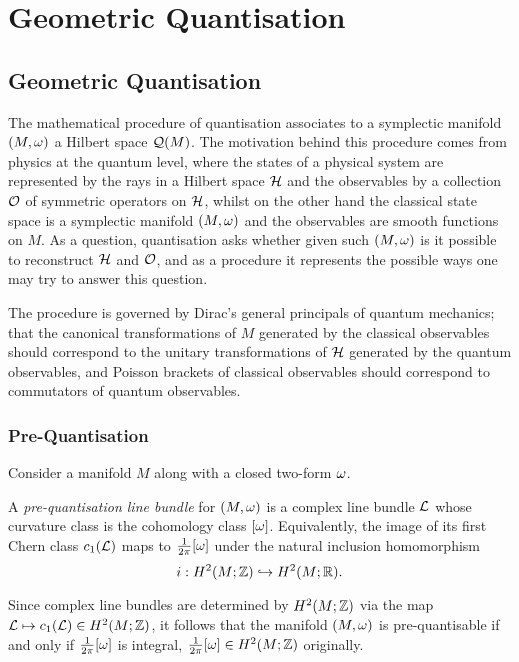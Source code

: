 \chapter{Geometric Quantisation}

\section{Geometric Quantisation}

The mathematical procedure of quantisation associates to a symplectic manifold $(M,\omega)$ a Hilbert space $\mathcal{Q}(M)$. The motivation behind this procedure comes from physics at the quantum level, where the states of a physical system are represented by the rays in a Hilbert space $\mathcal{H}$ and the observables by a collection $\mathcal{O}$ of symmetric operators on $\mathcal{H}$, whilst on the other hand the classical state space is a symplectic manifold $(M,\omega)$ and the observables are smooth functions on $M$. As a question, quantisation asks whether given such $(M,\omega)$ is it possible to reconstruct $\mathcal{H}$ and $\mathcal{O}$, and as a procedure it represents the possible ways one may try to answer this question.

The procedure is governed by Dirac's general principals of quantum mechanics; that the canonical transformations of $M$ generated by the classical observables should correspond to the unitary transformations of $\mathcal{H}$ generated by the quantum observables, and Poisson brackets of classical observables should correspond to commutators of quantum observables.

\subsection{Pre-Quantisation}

Consider a manifold $M$ along with a closed two-form $\omega$.

\begin{defn}
	A \emph{pre-quantisation line bundle} for $(M,\omega)$ is a complex line bundle $\mathcal{L}$ whose curvature class is the cohomology class $[\omega]$. Equivalently, the image of its first Chern class $c_{1}(\mathcal{L})$ maps to $\tfrac{1}{2\pi}[\omega]$ under the natural inclusion homomorphism
	\begin{equation*}
		i: H^{2}(M;\mathbb{Z}) \hookrightarrow H^{2}(M;\mathbb{R}).
	\end{equation*}
\end{defn}

Since complex line bundles are determined by $H^{2}(M;\mathbb{Z})$ via the map $\mathcal{L} \mapsto c_{1}(\mathcal{L}) \in H^{2}(M;\mathbb{Z})$, it follows that the manifold $(M,\omega)$ is pre-quantisable if and only if $\tfrac{1}{2\pi}[\omega]$ is integral, \ie $\tfrac{1}{2\pi}[\omega] \in H^{2}(M;\mathbb{Z})$ originally.

